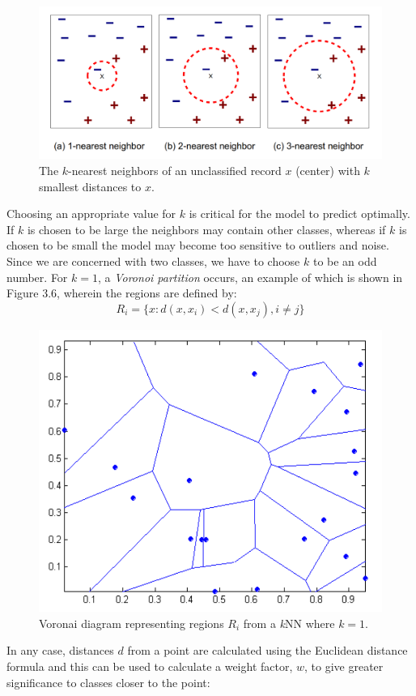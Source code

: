 \documentclass[a4paper, 12pt]{report}
\theoremstyle{definition}
\begin{document}
\begin{figure}[h!]
  \centering
  \includegraphics[width=0.97\linewidth]{im/kNNex.png}
  \caption{The $k$-nearest neighbors of an unclassified record $x$ (center) with $k$ smallest distances to $x$.}
  \label{fig:kNN1}
\end{figure}

Choosing an appropriate value for $k$ is critical for the model to predict optimally. If $k$ is chosen to be large the neighbors may contain other classes, whereas if $k$ is chosen to be small the model may become too sensitive to outliers and noise. \autocite{patternrecognition} Since we are concerned with two classes, we have to choose $k$ to be an odd number. For $k = 1$, a \textit{Voronoi partition} occurs, an example of which is shown in Figure 3.6, wherein the regions are defined by: \autocite{introdatamining}
\begin{equation}
    R_i = \{ x : d(x, x_i) < d(x,x_j), i \neq j \}
\end{equation}

\begin{figure}[h!]
  \centering
  \includegraphics[width=0.5\linewidth]{im/1NNVoronoi.png}
  \caption{Voronai diagram representing regions $R_i$ from a \textit{k}NN where $k=1$.}
  \label{fig:1NN}
\end{figure}

\newpage
In any case, distances $d$ from a point are calculated using the Euclidean distance formula and this can be used to calculate a weight factor, $w$, to give greater significance to classes closer to the point:
\end{document}

